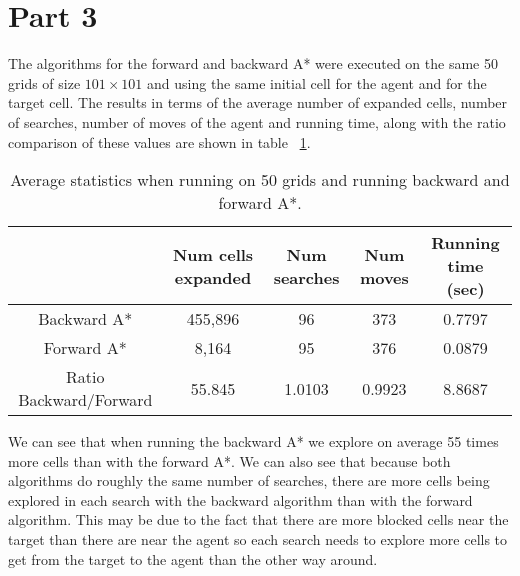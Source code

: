 \documentclass{article}
\begin{document}
\section*{Part 3}

The algorithms for the forward and backward A* were executed on the same 50 grids of size $101 \times 101$ and using the same initial cell for the agent and for the target cell. The results in terms of the average number of expanded cells, number of searches, number of moves of the agent and running time, along with the ratio comparison of these values are shown in table~ \ref{tab:back_for}.

\begin{table}[ht]
  \begin{center}
    \begin{tabular}{|*{5}{c|}}
      \cline{2-5}
      \multicolumn{1}{c|}{} & Num cells expanded & Num searches & Num moves & Running time (sec) \\ \hline
      Backward A* & 455,896 & 96 & 373 & 0.7797\\ \hline 
      Forward A*  & 8,164  & 95 & 376 & 0.0879 \\ \hline \hline
      Ratio Backward/Forward & 55.845 & 1.0103 & 0.9923 & 8.8687 \\ \hline
    \end{tabular}
  \end{center}
  \caption{Average statistics when running on 50 grids and running backward and forward A*.}
  \label{tab:back_for}
\end{table}

We can see that when running the backward A* we explore on average 55 times more cells than with the forward A*. We can also see that because both algorithms do roughly the same number of searches, there are more cells being explored in each search with the backward algorithm than with the forward algorithm. This may be due to the fact that there are more blocked cells near the target than there are near the agent so each search needs to explore more cells to get from the target to the agent than the other way around.
\end{document}
